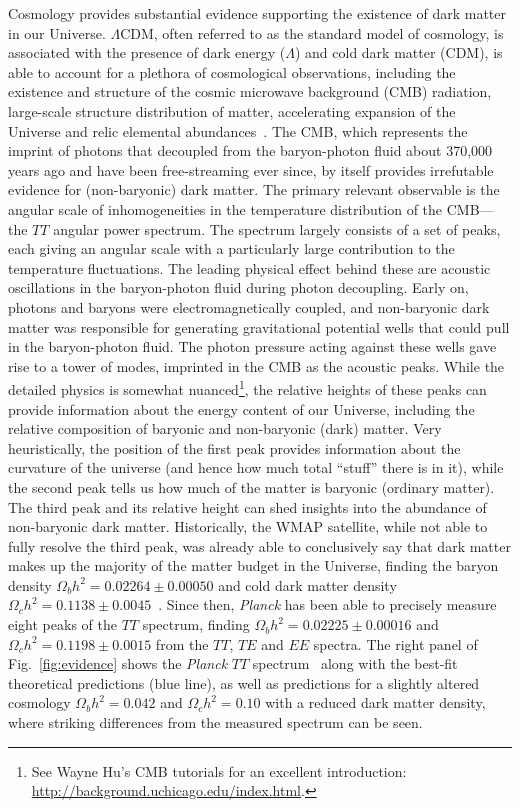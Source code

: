 Cosmology provides substantial evidence supporting the existence of dark matter in our Universe. $\Lambda$CDM, often referred to as the standard model of cosmology, is associated with the presence of dark energy ($\Lambda$) and cold dark matter (CDM), is able to account for a plethora of cosmological observations, including the existence and structure of the cosmic microwave background (CMB) radiation, large-scale structure distribution of matter, accelerating expansion of the Universe and relic elemental abundances~\cite{Dodelson:1282338,Kolb:1990vq}. The CMB, which represents the imprint of photons that decoupled from the baryon-photon fluid about 370,000 years ago and have been free-streaming ever since, by itself provides irrefutable evidence for (non-baryonic) dark matter. The primary relevant observable is the angular scale of inhomogeneities in the temperature distribution of the CMB---the $TT$ angular power spectrum. The spectrum largely consists of a set of peaks, each giving an angular scale with a particularly large contribution to the temperature fluctuations. The leading physical effect behind these are acoustic oscillations in the baryon-photon fluid during photon decoupling. Early on, photons and baryons were electromagnetically coupled, and non-baryonic dark matter was responsible for generating gravitational potential wells that could pull in the baryon-photon fluid. The photon pressure acting against these wells gave rise to a tower of modes, imprinted in the CMB as the acoustic peaks. While the detailed physics is somewhat nuanced\footnote{See Wayne Hu's CMB tutorials for an excellent introduction: \url{http://background.uchicago.edu/index.html}.}, the relative heights of these peaks can provide information about the energy content of our Universe, including the relative composition of baryonic and non-baryonic (dark) matter. Very heuristically, the position of the first peak provides information about the curvature of the universe (and hence how much total ``stuff'' there is in it), while the second peak tells us how much of the matter is baryonic (ordinary matter). The third peak and its relative height can shed insights into the abundance of non-baryonic dark matter. Historically, the WMAP satellite, while not able to fully resolve the third peak, was already able to conclusively say that dark matter makes up the majority of the matter budget in the Universe, finding the baryon density $\Omega_b h^2=0.02264\pm0.00050$ and cold dark matter density $\Omega_c h^2=0.1138\pm0.0045$~\cite{2013ApJS..208...19H}. Since then, \emph{Planck} has been able to precisely measure eight peaks of the $TT$ spectrum, finding $\Omega_b h^2= 0.02225\pm0.00016$ and $\Omega_c h^2=0.1198\pm0.0015$ from the $TT$, $TE$ and $EE$ spectra. The right panel of Fig.~\ref{fig:evidence} shows the \emph{Planck} $TT$ spectrum~\cite{Ade:2015xua} along with the best-fit theoretical predictions (blue line), as well as predictions for a slightly altered cosmology $\Omega_b h^2= 0.042$ and $\Omega_c h^2=0.10$ with a reduced dark matter density, where striking differences from the measured spectrum can be seen.

